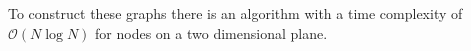     To construct these graphs there is an algorithm\cite{RNGCell} with
    a time complexity of \(\mathcal{O}(N \log N)\) for nodes on a two
    dimensional plane.

